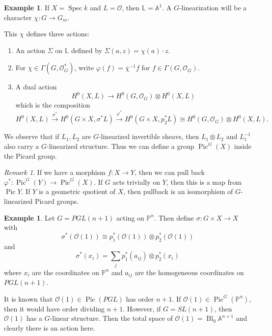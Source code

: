 \documentclass[leqno, openany]{memoir}
\theoremstyle{definition}
\newtheorem{exm}[thm]{Example}
\theoremstyle{remark}
\newtheorem{rmk}[thm]{Remark}
\theoremstyle{plain}
\theoremstyle{definition}
\theoremstyle{remark}
\newcommand{\A}{\mathbb{A}}
\renewcommand{\P}{\mathbb{P}}
\newcommand{\mc}[1]{\mathcal{#1}}
\newcommand{\ol}[1]{\overline{#1}}
\DeclareMathOperator{\Pic}{Pic}
\DeclareMathOperator{\Spec}{Spec}
\begin{document}
\begin{exm}
    If $X = \Spec k$ and $L = \mc{O}$, then $\mathbb{L} = \A^1$. A $G$-linearization will be a character $\chi \colon G \to G_m$.
\end{exm}

This $\chi$ defines three actions:
\begin{enumerate}
    \item An action $\Sigma$ on $\mathbb{L}$ defined by $\Sigma(a,z) = \chi(a) \cdot z$. 
    \item For $\ol{\chi} \in \Gamma(G, \mc{O}_G^*)$, write $\varphi(f) = \ol{\chi}^{-1} f$ for $f \in \Gamma(G, \mc{O}_G)$.
    \item A dual action
        \[ H^0(X,L) \to H^0(G, \mc{O}_G) \otimes H^0(X,L) \]
        which is the composition 
        \[ H^0(X,L) \xrightarrow{\sigma^*} H^0(G \times X, \sigma^* L) \xrightarrow{\varphi^*} H^0(G \times X, p_2^* L) \cong H^0(G, \mc{O}_G) \otimes H^0(X,L). \]
\end{enumerate}

We observe that if $L_1, L_2$ are $G$-linearized invertible sheavs, then $L_1 \otimes L_2$ and $L_1^{-1}$ also carry a $G$-linearized structure. Thus we can define a group $\Pic^G(X)$ inside the Picard group.

\begin{rmk}
    If we have a morphism $f \colon X \to Y$, then we can pull back $\varphi^* \colon \Pic^G(Y) \to \Pic^G(X)$. If $G$ acts trivially on $Y$, then this is a map from $\Pic Y$. If $Y$ is a geometric quotient of $X$, then pullback is an isomorphism of $G$-linearized Picard groups.
\end{rmk}

\begin{exm}
    Let $G = PGL(n+1)$ acting on $\P^n$. Then define $\sigma \colon G \times X \to X$ with
    \[ \sigma^*(\mc{O}(1)) \cong p_1^*(\mc{O}(1)) \otimes p_2^*(\mc{O}(1)) \]
    and
    \[ \sigma^*(x_i) = \sum_j p_1^*(a_{ij}) \otimes p_2^*(x_i) \]
    where $x_i$ are the coordinates on $\P^n$ and $a_{ij}$ are the homogeneous coordinates on $PGL(n+1)$.

    It is known that $\mc{O}(1) \in \Pic(PGL)$ has order $n+1$. If $\mc{O}(1) \in \Pic^G(\P^n)$, then it would have order dividing $n+1$. However, if $G = SL(n+1)$, then $\mc{O}(1)$ has a $G$-linear structure. Then the total space of $\mc{O}(1) = \operatorname{Bl}_0 \A^{n+1}$ and clearly there is an action here.
\end{exm}
\end{document}

